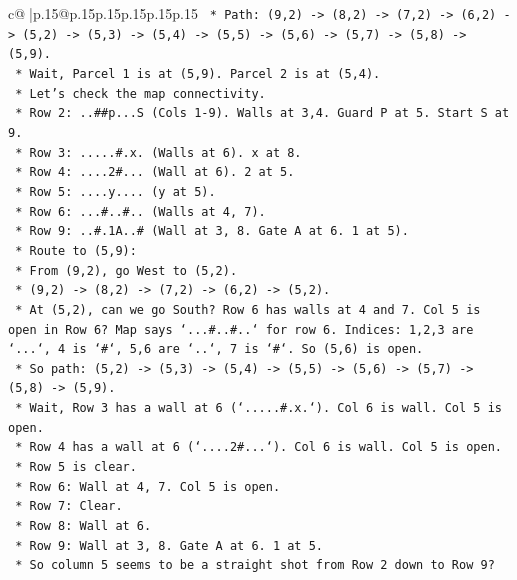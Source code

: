 \documentclass{article}
\begin{document}
{\begin{supertabular}{c@{$\;$}|p{.15\linewidth}@{}p{.15\linewidth}p{.15\linewidth}p{.15\linewidth}p{.15\linewidth}p{.15\linewidth}}
{{{\texttt{    *   Path: (9,2) {-}> (8,2) {-}> (7,2) {-}> (6,2) {-}> (5,2) {-}> (5,3) {-}> (5,4) {-}> (5,5) {-}> (5,6) {-}> (5,7) {-}> (5,8) {-}> (5,9).} \\
\texttt{    *   Wait, Parcel 1 is at (5,9). Parcel 2 is at (5,4).} \\
\texttt{    *   Let's check the map connectivity.} \\
\texttt{        *   Row 2: ..\#\#p...S (Cols 1{-}9). Walls at 3,4. Guard P at 5. Start S at 9.} \\
\texttt{        *   Row 3: .....\#.x. (Walls at 6). x at 8.} \\
\texttt{        *   Row 4: ....2\#... (Wall at 6). 2 at 5.} \\
\texttt{        *   Row 5: ....y.... (y at 5).} \\
\texttt{        *   Row 6: ...\#..\#.. (Walls at 4, 7).} \\
\texttt{        *   Row 9: ..\#.1A..\# (Wall at 3, 8. Gate A at 6. 1 at 5).} \\
\texttt{    *   Route to (5,9):} \\
\texttt{        *   From (9,2), go West to (5,2).} \\
\texttt{        *   (9,2) {-}> (8,2) {-}> (7,2) {-}> (6,2) {-}> (5,2).} \\
\texttt{        *   At (5,2), can we go South? Row 6 has walls at 4 and 7. Col 5 is open in Row 6? Map says `...\#..\#..` for row 6. Indices: 1,2,3 are `...`, 4 is `\#`, 5,6 are `..`, 7 is `\#`. So (5,6) is open.} \\
\texttt{        *   So path: (5,2) {-}> (5,3) {-}> (5,4) {-}> (5,5) {-}> (5,6) {-}> (5,7) {-}> (5,8) {-}> (5,9).} \\
\texttt{        *   Wait, Row 3 has a wall at 6 (`.....\#.x.`). Col 6 is wall. Col 5 is open.} \\
\texttt{        *   Row 4 has a wall at 6 (`....2\#...`). Col 6 is wall. Col 5 is open.} \\
\texttt{        *   Row 5 is clear.} \\
\texttt{        *   Row 6: Wall at 4, 7. Col 5 is open.} \\
\texttt{        *   Row 7: Clear.} \\
\texttt{        *   Row 8: Wall at 6.} \\
\texttt{        *   Row 9: Wall at 3, 8. Gate A at 6. 1 at 5.} \\
\texttt{        *   So column 5 seems to be a straight shot from Row 2 down to Row 9?} \\
}}}
\end{supertabular}}
\end{document}
